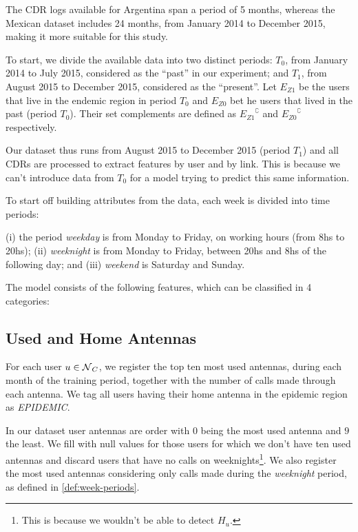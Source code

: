 The CDR logs available for Argentina span a period of 5 months,
whereas the Mexican dataset includes 24 months, from January 2014 to December 2015, making it more suitable for this study.

To start, we divide the available data into two distinct periods:
$T_0$, from January 2014 to July 2015, considered as the ``past'' in our experiment;
and $T_1$, from August 2015 to December 2015, considered as the ``present''. Let $E_{Z1}$ be the users that live in the endemic region in period $T_0$
and  $E_{Z0}$ bet he users that lived in the past (period $T_0$). Their set complements are defined as ${ E_{Z1} }^{\complement}$ and ${ E_{Z0} }^{\complement}$ respectively.

Our dataset thus runs from August 2015 to December 2015 (period $T_1$) and all CDRs are processed to extract features by user and by link. This is because we can't introduce data from $T_0$ for a model trying to predict this same information.

To start off building attributes from the data, each week is divided into time periods:
\begin{definition}\label{def:week-periods}
	(i) the period \textit{weekday} is from Monday to Friday, on working hours (from 8hs to 20hs); (ii) \textit{weeknight} is from Monday to Friday, between 20hs and 8hs of the following day;
	and (iii) \textit{weekend} is Saturday and Sunday.
\end{definition}


The model consists of the following features, which can be classified in 4 categories:


\subsection{Used and Home Antennas}\label{homeantenna}

For each user $u \in \operatorname{\mathcal{N}}_C$, we register the top ten most used antennas, during each month of the training period,
together with the number of calls made through each antenna. We tag all users having their home antenna in the epidemic region as \textit{EPIDEMIC}.

In our dataset user antennas are order with $0$ being the most used antenna and $9$ the least. We fill with null values for those users for which we don't have ten used antennas and discard users that have no calls on weeknights\footnote{This is because we wouldn't be able to detect $H_u$.}.
%
%
We also register the most used antennas considering only calls made during the \textit{weeknight} period, as defined in \cref{def:week-periods}. %

